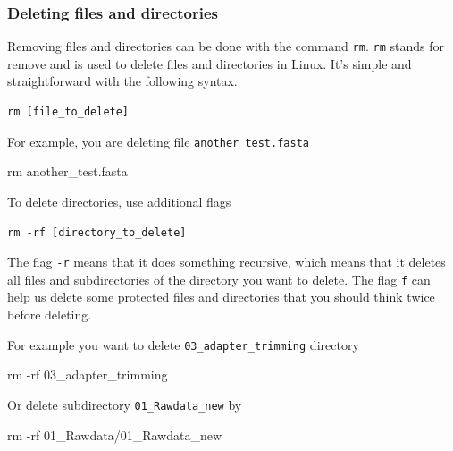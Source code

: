 \documentclass[
  letterpaper,
  DIV=11,
  numbers=noendperiod]{scrreprt}
\newenvironment{Shaded}{\begin{snugshade}}{\end{snugshade}}
\newcommand{\AttributeTok}[1]{\textcolor[rgb]{0.40,0.45,0.13}{#1}}
\newcommand{\FunctionTok}[1]{\textcolor[rgb]{0.28,0.35,0.67}{#1}}
\newcommand{\NormalTok}[1]{\textcolor[rgb]{0.00,0.23,0.31}{#1}}
\begin{document}
\hypertarget{deleting-files-and-directories}{%
\subsubsection*{Deleting files and
directories}\label{deleting-files-and-directories}}

Removing files and directories can be done with the command \texttt{rm}.
\texttt{rm} stands for remove and is used to delete files and
directories in Linux. It's simple and straightforward with the following
syntax.

\begin{verbatim}
rm [file_to_delete]
\end{verbatim}

For example, you are deleting file \texttt{another\_test.fasta}

\begin{Shaded}
\begin{Highlighting}[]
\FunctionTok{rm}\NormalTok{ another\_test.fasta}
\end{Highlighting}
\end{Shaded}

To delete directories, use additional flags

\begin{verbatim}
rm -rf [directory_to_delete]
\end{verbatim}

The flag \texttt{-r} means that it does something recursive, which means
that it deletes all files and subdirectories of the directory you want
to delete. The flag \texttt{f} can help us delete some protected files
and directories that you should think twice before deleting.

For example you want to delete \texttt{03\_adapter\_trimming} directory

\begin{Shaded}
\begin{Highlighting}[]
\FunctionTok{rm} \AttributeTok{{-}rf}\NormalTok{ 03\_adapter\_trimming}
\end{Highlighting}
\end{Shaded}

Or delete subdirectory \texttt{01\_Rawdata\_new} by

\begin{Shaded}
\begin{Highlighting}[]
\FunctionTok{rm} \AttributeTok{{-}rf}\NormalTok{ 01\_Rawdata/01\_Rawdata\_new}
\end{Highlighting}
\end{Shaded}
\end{document}
